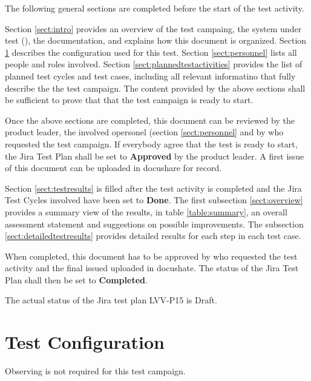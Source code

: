 \documentclass[DM,lsstdraft,STR,toc]{lsstdoc}
\begin{document}
The following general sections are completed before the start of the test activity.

Section \ref{sect:intro} provides an overview of the test campaing, the system under test (\product{}), the documentation, and explains how this document is organized.
Section \ref{sect:configuration}  describes the configuration used for this test.
Section \ref{sect:personnel} lists all people and roles involved.
Section \ref{sect:plannedtestactivities} provides the list of planned test cycles and test cases, including all relevant informatino that fully describe the the test campaign.
The content provided by the above sections shall be sufficient to prove that that the test campaign is ready to start.

Once the above sections are completed, this document can be reviewed by the product leader, the involved opersonel (section \ref{sect:personnel} and by who requested the test campaign.
If everybody agree that the test is ready to start, the Jira Test Plan shall be set to {\bf Approved} by the \product{} product leader.
A first issue of this document can be uploaded in docushare for record.

Section \ref{sect:testresults} is filled after the test activity is completed and the Jira Test Cycles involved have been set to {\bf Done}.
The first subsection \ref{sect:overview} provides a summary view of the results, in table \ref{table:summary}, 
an overall assessment statement and suggestions on possible improvements.
The subsection \ref{sect:detailedtestresults} provides detailed results for each step in each test case.

When completed, this document has to be approved by who requested the test activity and
the final issued uploaded in docushate. 
The status of the Jira Test Plan shall then be set to {\bf Completed}.

The actual status of the Jira test plan LVV-P15 is Draft.

\section{Test Configuration}
\label{sect:configuration}

Observing is not required for this test campaign.
\end{document}
